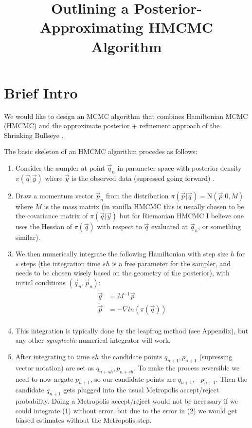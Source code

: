 \documentclass[12pt,a4paper]{article}
\title{Outlining a Posterior-Approximating HMCMC Algorithm}
\begin{document}
\maketitle
\section{Brief Intro}
We would like to design an MCMC algorithm that combines Hamiltonian MCMC (HMCMC) \parencite{neal_mcmc_2012,betancourt_geometric_2014,betancourt_conceptual_2017} and the approximate posterior + refinement approach of the Shrinking Bullseye \parencite{conrad_accelerating_2015}.

The basic skeleton of an HMCMC algorithm procedes as follows:
\begin{enumerate}
\item Consider the sampler at point $\vec{q}_n$ in parameter space with posterior density $\pi(\vec{q} | \vec{y})$ where $\vec{y}$ is the observed data (supressed going forward) .
\item Draw a momentum vector $\vec{p}_n$ from the distribution $\pi(\vec{p} | \vec{q} ) = \text{N}(\vec{p} |0, M)$ where $M$ is the mass matrix (in vanilla HMCMC this is usually chosen to be the covariance matrix of $\pi(\vec{q}|\vec{y})$ but for Riemanian HMCMC I believe one uses the Hessian of $\pi(\vec{q})$ with respect to $\vec{q}$ evaluated at $\vec{q}_n$, or something similar).
\item We then numerically integrate the following Hamiltonian with step size $h$ for $s$ steps (the integration time $sh$ is a free parameter for the sampler, and needs to be chosen wisely based on the geometry of the posterior), with initial conditions $(\vec{q}_n, \vec{p}_n)$:
\begin{equation}
\begin{split}
\dot{\vec{q}} &= M^{-1} \vec{p} \\
\dot{\vec{p}} &= - \nabla ln(\pi(\vec{q}))\\
\end{split}
\end{equation}
\item This integration is typically done by the leapfrog method (see Appendix), but any other \textit{symplectic} numerical integrator will work.
\item After integrating to time $sh$ the candidate points $q_{n+1}, p_{n+1}$ (supressing vector notation) are set as $q_{n+sh}, p_{n+sh}$.  To make the process reversible we need to now negate $p_{n+1}$, so our candidate points are $q_{n+1}, -p_{n+1}$.  Then the candidate $q_{n+1}$ gets plugged into the usual Metropolis accept/reject probability.  Doing a Metropolis accept/reject would not be necessary if we could integrate (1) without error, but due to the error in (2) we would get biased estimates without the Metropolis step.
\end{enumerate}
\end{document}
